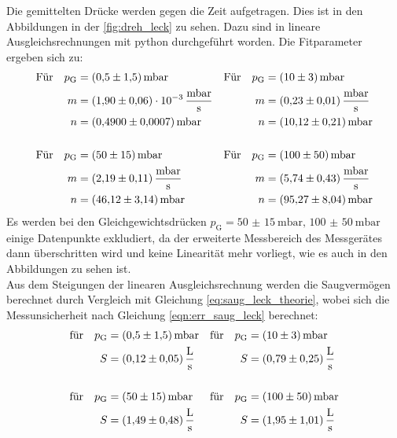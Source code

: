     \noindent Die gemittelten Drücke werden gegen die Zeit aufgetragen. Dies ist in den Abbildungen in der \autoref{fig:dreh_leck} zu sehen. Dazu sind in lineare Ausgleichsrechnungen 
    mit python \cite{scipy} durchgeführt worden. Die Fitparameter ergeben sich zu:
    \begin{align*}
      \text{Für} \quad  p_\text{G} &= \SI{0.5(15)}{\milli\bar}  & \text{Für} \quad  p_\text{G} &= \SI{10(3)}{\milli\bar}\\
      m &= \SI{1.90(6)e-3}{\milli\bar\per\second}           & m &= \SI{0.23 \pm 0.01}{\milli\bar\per\second} \\
      n &= \SI{0.49 \pm 0.0007}{\milli\bar}                 & n &= \SI{10.12 \pm 0.21}{\milli\bar} \\
      \\
      \text{Für} \quad  p_\text{G} &= \SI{50(15)}{\milli\bar}   & \text{Für} \quad  p_\text{G} &= \SI{100(50)}{\milli\bar}\\
      m &= \SI{2.19 \pm 0.11}{\milli\bar\per\second}        & m &= \SI{5.74 \pm 0.43}{\milli\bar\per\second} \\
      n &= \SI{46.12 \pm 3.14}{\milli\bar}                  & n &= \SI{95.27 \pm 8.04}{\milli\bar} 
    \end{align*}
    Es werden bei den Gleichgewichtsdrücken $p_\text{G} = \SI{50(15)}{\milli\bar}, \, \SI{100(50)}{\milli\bar}$ einige Datenpunkte exkludiert, da der erweiterte Messbereich des Messgerätes
    dann überschritten wird und keine Linearität mehr vorliegt, wie es auch in den Abbildungen zu sehen ist. \\
    Aus dem Steigungen der linearen Ausgleichsrechnung werden die Saugvermögen berechnet durch Vergleich mit Gleichung \eqref{eq:saug_leck_theorie}, wobei sich die Messunsicherheit nach Gleichung \eqref{eqn:err_saug_leck} berechnet:
    \begin{align*}
      \text{für} \quad p_\text{G} &= \SI{0.5(15)}{\milli\bar} & \text{für} \quad p_\text{G} &= \SI{10(3)}{\milli\bar} \\
      S &= \SI{0.12 \pm 0.05}{\litre\per\second}               & S &= \SI{0.79 \pm 0.25}{\litre\per\second}  \\
      \\
      \text{für} \quad p_\text{G} &= \SI{50(15)}{\milli\bar}  & \text{für} \quad p_\text{G} &= \SI{100(50)}{\milli\bar} \\
      S &= \SI{1.49 \pm 0.48}{\litre\per\second}               & S &= \SI{1.95 \pm 1.01}{\litre\per\second}  
    \end{align*}

